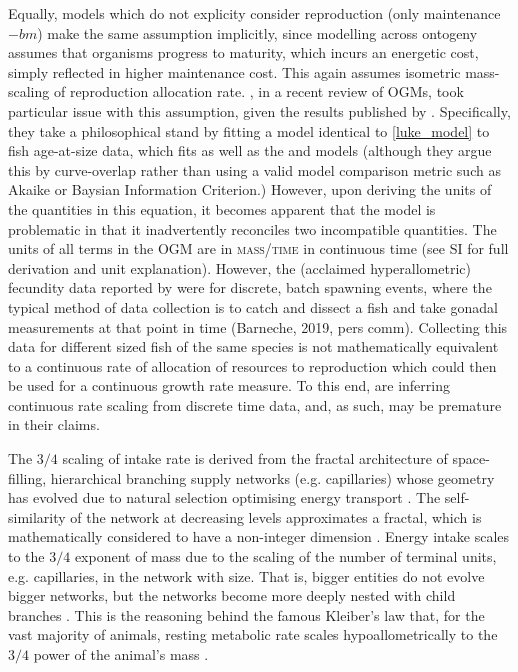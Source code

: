 \documentclass[a4paper]{article} %
\begin{document}
Equally, models which do not explicity consider reproduction (only maintenance $-bm$) make the same assumption implicitly, since modelling across ontogeny assumes that organisms progress to maturity, which incurs an energetic cost, simply reflected in higher maintenance cost. This again assumes isometric mass-scaling of reproduction allocation rate. \cite{Marshall2019b}, in a recent review of OGMs, took particular issue with this assumption, given the results published by \cite{Barneche2018d}. Specifically, they take a philosophical stand by fitting a model identical to \cref{luke_model} to fish age-at-size data, which fits as well as the \cite{west2001} and \cite{vonBert1938} models (although they argue this by curve-overlap rather than using a valid model comparison metric such as Akaike or Baysian Information Criterion.) However, upon deriving the units of the quantities in this equation, it becomes apparent that the \cite{Marshall2019b} model is problematic in that it inadvertently reconciles two incompatible quantities. The units of all terms in the OGM are in \textsc{mass/time} in continuous time (see SI for full derivation and unit explanation). However, the (acclaimed hyperallometric) fecundity data reported by \cite{Barneche2018d} were for discrete, batch spawning events, where the typical method of data collection is to catch and dissect a fish and take gonadal measurements at that point in time (Barneche, 2019, pers comm). Collecting this data for different sized fish of the same species is not mathematically equivalent to a continuous rate of allocation of resources to reproduction which could then be used for a continuous growth rate measure. To this end, \cite{Marshall2019b} are inferring continuous rate scaling from discrete time data, and, as such, may be premature in their claims.    

The $3/4$ scaling of intake rate is derived from the fractal architecture of space-filling, hierarchical branching supply networks (e.g. capillaries) whose geometry has evolved due to natural selection optimising energy transport \autocite{West1997, West2005}. The self-similarity of the network at decreasing levels approximates a fractal, which is mathematically considered to have a non-integer dimension \autocite{Hausdorff1918, Mandelbrot1982}. Energy intake scales to the $3/4$ exponent of mass due to the scaling of the number of terminal units, e.g. capillaries, in the network with size. That is, bigger entities do not evolve bigger networks, but the networks become more deeply nested with child branches \autocite{West1997}. This is the reasoning behind the famous Kleiber's law that, for the vast majority of animals, resting metabolic rate scales hypoallometrically to the $3/4$ power of the animal's mass \autocite{Kleiber1947, peters1983, niklas1994plant}.
\end{document}
